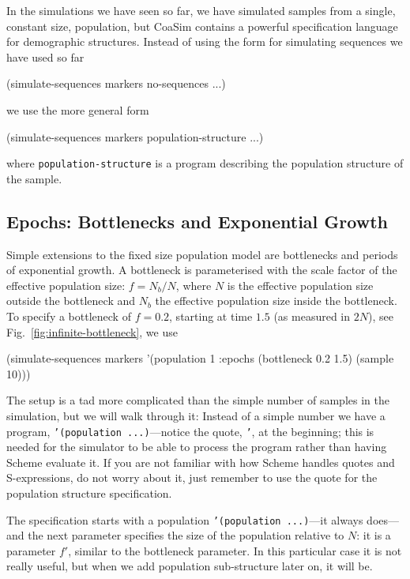 \documentclass{manual}
\begin{document}
\begin{empfile}
In the simulations we have seen so far, we have simulated samples from
a single, constant size, population, but CoaSim contains a powerful
specification language for demographic structures.  Instead of using
the form for simulating sequences we have used so far
\begin{code}
(simulate-sequences markers no-sequences ...)
\end{code}
we use the more general form
\begin{code}
(simulate-sequences markers population-structure ...)
\end{code}
where \texttt{population-structure} is a program describing the
population structure of the sample.


\subsection{Epochs: Bottlenecks and Exponential Growth}
\label{sec:epochs}


Simple extensions to the fixed size population model are bottlenecks
and periods of exponential growth.  A bottleneck is parameterised with
the scale factor of the effective population size: $f=N_b/N$, where
$N$ is the effective population size outside the bottleneck and $N_b$
the effective population size inside the bottleneck.  To specify a
bottleneck of $f=0.2$, starting at time $1.5$ (as measured in $2N$),
see Fig.~\ref{fig:infinite-bottleneck}, we use
\begin{code}
(simulate-sequences markers
     '(population 1 :epochs (bottleneck 0.2 1.5) (sample 10)))
\end{code}


The setup is a tad more complicated than the simple number of samples
in the simulation, but we will walk through it: Instead of a simple
number we have a program, \texttt{'(population ...)}---notice the
quote, \texttt{'}, at the beginning; this is needed for the simulator
to be able to process the program rather than having Scheme evaluate
it.  If you are not familiar with how Scheme handles quotes and
S-expressions, do not worry about it, just remember to use the quote
for the population structure specification.

The specification starts with a population \texttt{'(population
  ...)}---it always does---and the next parameter specifies the size
of the population relative to $N$: it is a parameter $f'$, similar
to the bottleneck parameter.  In this particular case it is not really
useful, but when we add population sub-structure later on, it will be.


\end{empfile}
\end{document}
